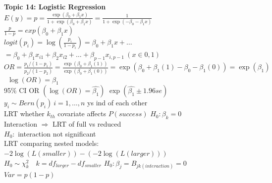 \documentclass[10pt,landscape]{article}
\newcommand{\B}{\beta}
\newcommand{\ra}{\Rightarrow}
\begin{document}
\begin{multicols*}{4}
\textbf{Topic 14: Logistic Regression}\\
$E(y)=p=\frac{\exp(\B_0+\B_1x)}{1+\exp(\B_0+\B_1x)}=\frac{1}{1+\exp(-\B_0-\B_1x)}$\\
$\frac{p}{1-p}=exp(\B_0+\B_1x)$\\
$logit(p_i)=\log\left(\frac{p_i}{1-p_i}\right)=\B_0+\B_1x+\dots$\\
$=\B_0+\B_1x_{i1}+\B_2x_{i2}+\dots+\B_{p-1}x_{i,p-1} \  (x\in 0,1)$\\ $OR=\frac{p_1/(1-p_1)}{p_2/(1-p_2)}=\frac{\exp(\B_0+\B_1(1))}{\exp(\B_0+\B_1(0))}=\exp(\B_0+\B_1(1)-\B_0-\B_1(0))=\exp(\B_1)$ \ $\log(OR)=\B_1$\\
95\% CI OR $(\log(OR)=\hat{\B_1})$ $\exp(\hat{\B_1}\pm 1.96se)$\\
$y_i\sim Bern(p_i) \ i=1,\dots,n$ ys ind of each other\\
LRT whether $k_{th}$ covariate affects $P(success)$ $H_0:\B_k=0$\\
Interaction $\ra$ LRT of full vs reduced\\
$H_0:$ interaction not significant\\
LRT comparing nested models: $-2\log(L(smaller))-(-2\log(L(larger)))$\\
$H_0\sim \chi^2_k \quad k=df_{larger}-df_{smaller}$
$H_0:\B_j=B_{jk(interaction)}=0$\\
$Var=p(1-p)$\\


\end{multicols*}
\end{document}
